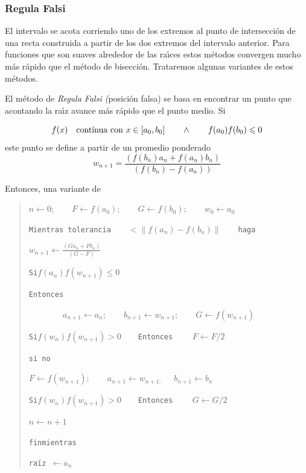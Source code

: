 \documentclass[spanish,titlepage,11pt]{article}
\begin{document}
\subsubsection{Regula Falsi}

El intervalo se acota corriendo uno de los extremos al punto de
intersecci\'{o}n de una recta construida a partir de los dos extremos del
intervalo anterior. Para funciones que son suaves alrededor de las ra\'{\i}ces
estos m\'{e}todos convergen mucho m\'{a}s r\'{a}pido que el m\'{e}todo de
bisecci\'{o}n. Trataremos algunas variantes de estos m\'{e}todos.

El m\'{e}todo de \textit{Regula Falsi (}posici\'{o}n falsa) se basa en
encontrar un punto que acontando la ra\'{\i}z avance m\'{a}s r\'{a}pido que el
punto medio. Si%

\[
f(x)\quad\text{cont\'{\i}nua con }x\in\left[  a_{0},b_{0}\right]  \qquad
\wedge\qquad f(a_{0})f(b_{0})\leqslant0
\]
este punto se define a partir de un promedio ponderado
\[
w_{n+1}=\frac{(f(b_{n})a_{n}+f(a_{n})b_{n})}{\left(  f(b_{n})-f(a_{n})\right)
}
\]

Entonces, una variante de

\begin{quotation}
$n\leftarrow0;\qquad F\leftarrow f(a_{0});\qquad G\leftarrow f(b_{0});\qquad
w_{0}\leftarrow a_{0}$

\texttt{Mientras tolerancia}$\qquad<\left\|  f(a_{n})-f(b_{n})\right\|
\qquad$\texttt{haga}

\texttt{\qquad}$w_{n+1}\leftarrow\frac{(Ga_{n}+Fb_{n})}{\left(  G-F\right)  }$

\texttt{\qquad Si\qquad}$f(a_{n})f(w_{n+1})\leqslant0$

\texttt{\qquad Entonces}

$\qquad\qquad a_{n+1}\leftarrow a_{n};\qquad b_{n+1}\leftarrow w_{n+1};\qquad
G\leftarrow f(w_{n+1})$

\qquad\qquad\texttt{Si\qquad}$f(w_{n})f(w_{n+1})>0\qquad$\texttt{Entonces}%
$\qquad F\leftarrow F/2$

\texttt{\qquad si no}

\qquad\texttt{\qquad\qquad}$F\leftarrow f(w_{n+1});\qquad a_{n+1}\leftarrow
w_{n+1;\qquad}b_{n+1}\leftarrow b_{n}$

\qquad\qquad\texttt{Si\qquad}$f(w_{n})f(w_{n+1})>0\qquad$\texttt{Entonces}%
$\qquad G\leftarrow G/2$

\qquad$n\leftarrow n+1$

\texttt{finmientras}

\texttt{ra\'{\i}z\ }$\leftarrow a_{n}$
\end{quotation}
\end{document}
